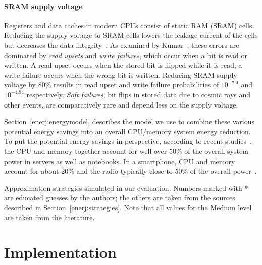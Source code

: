 \paragraph{SRAM supply voltage}
Registers and data caches in modern CPUs consist of static RAM (SRAM)
cells. Reducing the supply voltage to SRAM cells lowers the leakage
current of the cells but decreases the data integrity~\cite{drowsycaches}. As
examined by Kumar~\cite{sramthesis}, these
errors are dominated by \emph{read upsets} and \emph{write failures},
which occur when a bit is read or written. A read upset occurs when
the stored bit is flipped while it is read; a write failure occurs when the
wrong bit is written.
Reducing SRAM supply voltage by 80\% results in
read upset and write failure probabilities of $10^{-7.4}$ and
$10^{-4.94}$ respectively.
\emph{Soft failures}, bit flips in
stored data due to cosmic rays and other events, are comparatively
rare and depend less on the supply voltage.

\medskip
\noindent
Section~\ref{enerj:energymodel} describes the model we use to combine these
various potential energy savings into an overall CPU/memory system energy
reduction.
To put the potential energy savings in perspective, according to
recent studies~\cite{googlepower, aqeel}, the CPU and memory together account
for well over 50\% of the overall system power in servers as well as
notebooks. In a smartphone, CPU and memory account for about 20\% and
the radio typically close to 50\% of the overall
power~\cite{carroll2010}.






\begin{table}
\small
\begin{centering}

\end{centering}
\caption{Approximation strategies simulated in our evaluation.
Numbers marked with * are educated guesses by the authors; the others
are taken from the sources described in Section~\ref{enerj:strategies}. Note that
all values for the Medium level are taken from the literature.}
\label{enerj:table:approximations}
\end{table}




\section{Implementation}
\label{enerj:sec:impl}

